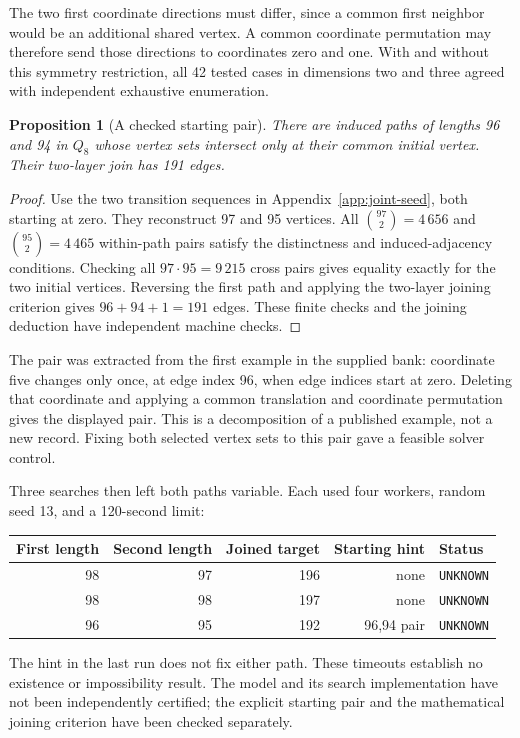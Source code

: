 \documentclass[11pt,a4paper]{article}
\newtheorem{proposition}[theorem]{Proposition}
\theoremstyle{definition}
\theoremstyle{remark}
\newcommand{\Q}{Q}
\begin{document}
The two first coordinate directions must differ, since a common first neighbor would be an additional shared vertex. A common coordinate permutation may therefore send those directions to coordinates zero and one. With and without this symmetry restriction, all 42 tested cases in dimensions two and three agreed with independent exhaustive enumeration.

\begin{proposition}[A checked starting pair]\label{prop:joint-seed}
There are induced paths of lengths 96 and 94 in $\Q_8$ whose vertex sets intersect only at their common initial vertex. Their two-layer join has 191 edges.
\end{proposition}
\begin{proof}
Use the two transition sequences in Appendix~\ref{app:joint-seed}, both starting at zero. They reconstruct 97 and 95 vertices. All $\binom{97}{2}=4\,656$ and $\binom{95}{2}=4\,465$ within-path pairs satisfy the distinctness and induced-adjacency conditions. Checking all $97\cdot95=9\,215$ cross pairs gives equality exactly for the two initial vertices. Reversing the first path and applying the two-layer joining criterion gives $96+94+1=191$ edges. These finite checks and the joining deduction have independent machine checks.
\end{proof}

The pair was extracted from the first example in the supplied bank: coordinate five changes only once, at edge index 96, when edge indices start at zero. Deleting that coordinate and applying a common translation and coordinate permutation gives the displayed pair. This is a decomposition of a published example, not a new record. Fixing both selected vertex sets to this pair gave a feasible solver control.

Three searches then left both paths variable. Each used four workers, random seed 13, and a 120-second limit:
\begin{center}
\begin{tabular}{rrrrl}
\toprule
First length & Second length & Joined target & Starting hint & Status\\
\midrule
98 & 97 & 196 & none & \texttt{UNKNOWN}\\
98 & 98 & 197 & none & \texttt{UNKNOWN}\\
96 & 95 & 192 & 96,94 pair & \texttt{UNKNOWN}\\
\bottomrule
\end{tabular}
\end{center}
The hint in the last run does not fix either path. These timeouts establish no existence or impossibility result. The model and its search implementation have not been independently certified; the explicit starting pair and the mathematical joining criterion have been checked separately.
\end{document}
